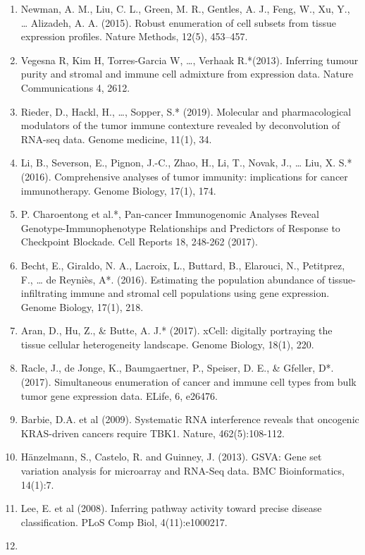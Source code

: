\documentclass[
  12pt,
]{book}
\begin{document}
\begin{enumerate}
\def\labelenumi{\arabic{enumi}.}
\item
  Newman, A. M., Liu, C. L., Green, M. R., Gentles, A. J., Feng, W., Xu, Y., \ldots{} Alizadeh, A. A. (2015). Robust enumeration of cell subsets from tissue expression profiles. Nature Methods, 12(5), 453--457.
\item
  Vegesna R, Kim H, Torres-Garcia W, \ldots, Verhaak R.*(2013). Inferring tumour purity and stromal and immune cell admixture from expression data. Nature Communications 4, 2612.
\item
  Rieder, D., Hackl, H., \ldots, Sopper, S.* (2019). Molecular and pharmacological modulators of the tumor immune contexture revealed by deconvolution of RNA-seq data. Genome medicine, 11(1), 34.
\item
  Li, B., Severson, E., Pignon, J.-C., Zhao, H., Li, T., Novak, J., \ldots{} Liu, X. S.* (2016). Comprehensive analyses of tumor immunity: implications for cancer immunotherapy. Genome Biology, 17(1), 174.
\item
  P. Charoentong et al.*, Pan-cancer Immunogenomic Analyses Reveal Genotype-Immunophenotype Relationships and Predictors of Response to Checkpoint Blockade. Cell Reports 18, 248-262 (2017).
\item
  Becht, E., Giraldo, N. A., Lacroix, L., Buttard, B., Elarouci, N., Petitprez, F., \ldots{} de Reyniès, A*. (2016). Estimating the population abundance of tissue-infiltrating immune and stromal cell populations using gene expression. Genome Biology, 17(1), 218.
\item
  Aran, D., Hu, Z., \& Butte, A. J.* (2017). xCell: digitally portraying the tissue cellular heterogeneity landscape. Genome Biology, 18(1), 220.
\item
  Racle, J., de Jonge, K., Baumgaertner, P., Speiser, D. E., \& Gfeller, D*. (2017). Simultaneous enumeration of cancer and immune cell types from bulk tumor gene expression data. ELife, 6, e26476.
\item
  Barbie, D.A. et al (2009). Systematic RNA interference reveals that oncogenic KRAS-driven cancers require TBK1. Nature, 462(5):108-112.
\item
  Hänzelmann, S., Castelo, R. and Guinney, J. (2013). GSVA: Gene set variation analysis for microarray and RNA-Seq data. BMC Bioinformatics, 14(1):7.
\item
  Lee, E. et al (2008). Inferring pathway activity toward precise disease classification. PLoS Comp Biol, 4(11):e1000217.
\item

\end{enumerate}
\end{document}
